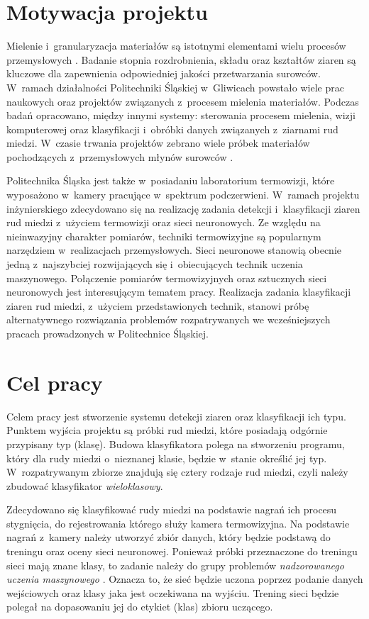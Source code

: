 \section{Motywacja projektu}
Mielenie i~granularyzacja materiałów są istotnymi elementami wielu procesów
przemysłowych \cite{budzan_grains}.
Badanie stopnia rozdrobnienia, składu oraz kształtów ziaren są kluczowe dla
zapewnienia odpowiedniej jakości przetwarzania surowców.
W~ramach działalności Politechniki Śląskiej w~Gliwicach powstało wiele prac
naukowych oraz projektów związanych z~procesem mielenia materiałów.
Podczas badań opracowano, między innymi systemy: sterowania procesem mielenia,
wizji komputerowej oraz klasyfikacji i~obróbki danych związanych z~ziarnami rud
miedzi.
W~czasie trwania projektów zebrano wiele próbek materiałów pochodzących
z~przemysłowych młynów surowców \cite{budzan_grains, krauze_milling}.

Politechnika Śląska jest także w~posiadaniu laboratorium termowizji, które
wyposażono w~kamery pracujące w~spektrum podczerwieni.
W~ramach projektu inżynierskiego zdecydowano się na realizację zadania detekcji
i~klasyfikacji ziaren rud miedzi z~użyciem termowizji oraz sieci neuronowych.
Ze względu na nieinwazyjny charakter pomiarów, techniki termowizyjne są
popularnym narzędziem w~realizacjach przemysłowych.
Sieci neuronowe stanowią obecnie jedną z~najszybciej rozwijających się
i~obiecujących technik uczenia maszynowego.
Połączenie pomiarów termowizyjnych oraz sztucznych sieci neuronowych jest
interesującym tematem pracy.
Realizacja zadania klasyfikacji ziaren rud miedzi, z~użyciem przedstawionych
technik, stanowi próbę alternatywnego rozwiązania problemów rozpatrywanych we
wcześniejszych pracach prowadzonych w Politechnice Śląskiej.

\section{Cel pracy}
Celem pracy jest stworzenie systemu detekcji ziaren oraz klasyfikacji ich typu.
Punktem wyjścia projektu są próbki rud miedzi, które posiadają odgórnie
przypisany typ (klasę).
Budowa klasyfikatora polega na stworzeniu programu, który dla rudy miedzi
o~nieznanej klasie, będzie w~stanie określić jej typ.
W~rozpatrywanym zbiorze znajdują się cztery rodzaje rud miedzi, czyli należy
zbudować klasyfikator \emph{wieloklasowy}.

Zdecydowano się klasyfikować rudy miedzi na podstawie nagrań ich procesu
stygnięcia, do rejestrowania którego służy kamera termowizyjna.
Na podstawie nagrań z~kamery należy utworzyć zbiór danych, który będzie podstawą
do treningu oraz oceny sieci neuronowej.
Ponieważ próbki przeznaczone do treningu sieci mają znane klasy, to zadanie
należy do grupy problemów \emph{nadzorowanego uczenia maszynowego}
\cite[str.~108]{chollet_dl}.
Oznacza to, że sieć będzie uczona poprzez podanie danych wejściowych oraz klasy
jaka jest oczekiwana na wyjściu.
Trening sieci będzie polegał na dopasowaniu jej do etykiet (klas) zbioru
uczącego.

